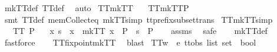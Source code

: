 \begin{isabellebody}
\ mkTT{}{\isacharunderscore}def\ TT{}{\isacharunderscore}def\ \isamarkupfalse%
\ auto%
\endisatagproof
{\isafoldproof}%
%
\isadelimproof
\isanewline
%
\endisadelimproof
\isanewline
{}\isamarkupfalse%
\ TT{}{\isacharunderscore}mkTT{}{\isacharcolon}\isanewline
\ \ \ {\isachardoublequoteopen}TT{}{\isacharparenleft}mkTT{}{\isacharparenleft}P{\isacharparenright}{\isacharparenright}{\isachardoublequoteclose}\isanewline
%
\isadelimproof
\ \ %
\endisadelimproof
%
\isatagproof
{}\isamarkupfalse%
\ {\isacharparenleft}smt\ TT{}{\isacharunderscore}def\ mem{\isacharunderscore}Collect{\isacharunderscore}eq\ mkTT{}{\isacharunderscore}simp\ tt{\isacharunderscore}prefix{\isacharunderscore}subset{\isacharunderscore}trans{\isacharparenright}%
\endisatagproof
{\isafoldproof}%
%
\isadelimproof
\isanewline
%
\endisadelimproof
\isanewline
{}\isamarkupfalse%
\ TT{}{\isacharunderscore}mkTT{}{\isacharunderscore}simp{\isacharcolon}\isanewline
\ \ \ {\isachardoublequoteopen}TT{}\ P{\isachardoublequoteclose}\isanewline
\ \ \ {\isachardoublequoteopen}{\isacharparenleft}{\isasymexists}x{\isachardot}\ s\ {\isasymin}\ x\ {\isasymand}\ {\isacharparenleft}mkTT{}\ x{\isacharparenright}\ {\isasymsubseteq}\ P{\isacharparenright}\ {\isacharequal}\ {\isacharparenleft}s\ {\isasymin}\ P{\isacharparenright}{\isachardoublequoteclose}\isanewline
%
\isadelimproof
\ \ %
\endisadelimproof
%
\isatagproof
{}\isamarkupfalse%
\ assms\ \isamarkupfalse%
\ safe\isanewline
\ \ \isamarkupfalse%
\ mkTT{}{\isacharunderscore}def\ \isamarkupfalse%
\ fastforce\isanewline
\ \ \isamarkupfalse%
\ TT{}{\isacharunderscore}fixpoint{\isacharunderscore}mkTT{}\ \isamarkupfalse%
\ blast%
\endisatagproof
{\isafoldproof}%
%
\isadelimproof
\isanewline
%
\endisadelimproof
\isanewline
{}\isamarkupfalse%
\ TT{}w\ {\isacharcolon}{\isacharcolon}\ {\isachardoublequoteopen}{\isacharprime}e\ ttobs\ list\ set\ {\isasymRightarrow}\ bool{\isachardoublequoteclose}\ \isanewline

\end{isabellebody}
